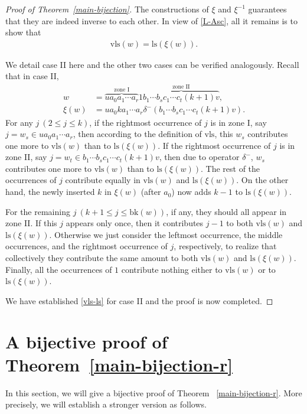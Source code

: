 \documentclass[12pt]{amsart}
\numberwithin{equation}{section}
\theoremstyle{plain}
\theoremstyle{definition}
\def\bk{\mathrm{bk}}
\def\ls{\mathrm{ls}}
\def\wls{\mathrm{vls}}
\begin{document}
\begin{proof}[Proof of Theorem~\ref{main-bijection}]
The constructions of $\xi$ and $\xi^{-1}$ guarantees that they are indeed inverse to each other. In view of \eqref{L-Asc}, all it remains is to show that
\begin{align}\label{vls-ls}
\wls(w)=\ls(\xi(w)).
\end{align}

We detail case II here and the other two cases can be verified analogously. Recall that in case II,
\begin{align*}
w &=\overbrace{u a_0a_1\cdots a_r}^{\text{zone I}} 1 \overbrace{b_1\cdots b_s c_1\cdots c_t (k+1)v}^{\text{zone II}},\\
\xi(w) &=ua_0ka_1\cdots a_r\delta^-(b_1\cdots b_s c_1\cdots c_t(k+1)v).
\end{align*}
For any $j~(2\le j \le k)$, if the rightmost occurrence of $j$ is in zone I, say $j=w_s\in u a_0a_1\cdots a_r$, then according to the definition of $\wls$, this $w_s$ contributes one more to $\wls(w)$ than to $\ls(\xi(w))$. If the rightmost occurrence of $j$ is in zone II, say $j=w_t\in b_1\cdots b_s c_1\cdots c_t (k+1)v$, then due to operator $\delta^-$, $w_s$ contributes one more to $\wls(w)$ than to $\ls(\xi(w))$. The rest of the occurrences of $j$ contribute equally in $\wls(w)$ and $\ls(\xi(w))$. On the other hand, the newly inserted $k$ in $\xi(w)$ (after $a_0$) now adds $k-1$ to $\ls(\xi(w))$.

For the remaining $j~(k+1\le j\le\bk(w))$, if any, they should all appear in zone II. If this $j$ appears only once, then it contributes $j-1$ to both $\wls(w)$ and $\ls(\xi(w))$. Otherwise we just consider the leftmost occurrence, the middle occurrences, and the rightmost occurrence of $j$, respectively, to realize that collectively they contribute the same amount to both $\wls(w)$ and $\ls(\xi(w))$. Finally, all the occurrences of $1$ contribute nothing either to $\wls(w)$ or to $\ls(\xi(w))$.

We have established \eqref{vls-ls} for case II and the proof is now completed.
\end{proof}

\section{A bijective proof of Theorem~\ref{main-bijection-r}}\label{sec:bijection}
In this section, we will give a bijective proof of Theorem
~\ref{main-bijection-r}. More precisely, we will establish a stronger version as follows.
\end{document}
